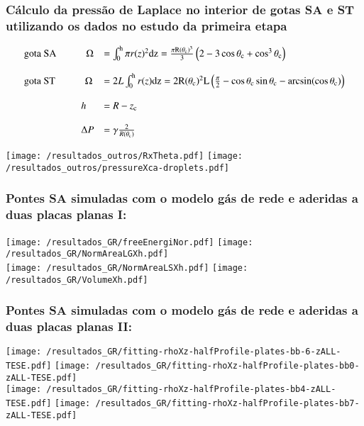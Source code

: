 \documentclass[8pt]{beamer}
\begin{document}
\begin{frame}
\frametitle{Cálculo da pressão de Laplace no interior de gotas SA e ST utilizando os dados no estudo da {\bf primeira etapa}}	
	\begin{equation*}
		\begin{array}{ll}
		{\rm gota~SA}~~~~~~~~~~~~ \Omega &= \int_{\rm 0}^{\rm h} \pi r(z)^{\rm 2}\rm{d}z = \frac{\pi R(\theta_{\rm c})^{\rm 3}}{3}\left ( 2 - 3\cos\theta_{\rm c} + \cos^{\rm 3}\theta_{\rm c} \right )\\
			                             & \\
		{\rm gota~ST}~~~~~~~~~~~~ \Omega &= 2L\int_{\rm 0}^{\rm h} r(z)\rm{d}z =  2R(\theta_{\rm c})^{\rm 2} L\left ( \frac{\pi}{2} - \cos\theta_{\rm c}\sin\theta_{\rm c} -\arcsin(\cos\theta_{\rm c})  \right )\\
			                             & \\			
			~~~~~~~~~~~~~~~~~~~~~~~    h &= R - z_{\rm c}\\
			                             & \\			
	    ~~~~~~~~~~~~~~~~~~~~~~~ \Delta P &= \gamma\frac{2}{R(\theta_{\rm c})} \\			
		\end{array}
	\end{equation*}	

		\begin{center}
			\texttt{[image: /resultados\_outros/RxTheta.pdf]}
			\texttt{[image: /resultados\_outros/pressureXca-droplets.pdf]}
		\end{center}		

\end{frame}

\begin{frame}
\frametitle{Pontes SA simuladas com o modelo gás de rede e aderidas a duas placas planas I:}
	\begin{center}
	     \texttt{[image: /resultados\_GR/freeEnergiNor.pdf]}
	     \texttt{[image: /resultados\_GR/NormAreaLGXh.pdf]}\\
	     \texttt{[image: /resultados\_GR/NormAreaLSXh.pdf]}   
	     \texttt{[image: /resultados\_GR/VolumeXh.pdf]}
	\end{center}		
\end{frame}

\begin{frame}
\frametitle{Pontes SA simuladas com o modelo gás de rede e aderidas a duas placas planas II:}
	\begin{center}
		\texttt{[image: /resultados\_GR/fitting-rhoXz-halfProfile-plates-bb-6-zALL-TESE.pdf]}
        \texttt{[image: /resultados\_GR/fitting-rhoXz-halfProfile-plates-bb0-zALL-TESE.pdf]}\\
        \texttt{[image: /resultados\_GR/fitting-rhoXz-halfProfile-plates-bb4-zALL-TESE.pdf]}	
        \texttt{[image: /resultados\_GR/fitting-rhoXz-halfProfile-plates-bb7-zALL-TESE.pdf]}
	\end{center}
\end{frame}
\end{document}
